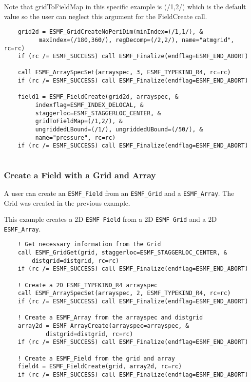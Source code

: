      Note that gridToFieldMap in this specific example is (/1,2/) which
     is the default value
     so the user can neglect this argument for the FieldCreate call. 

 \begin{verbatim}
    grid2d = ESMF_GridCreateNoPeriDim(minIndex=(/1,1/), &
          maxIndex=(/180,360/), regDecomp=(/2,2/), name="atmgrid", rc=rc)
    if (rc /= ESMF_SUCCESS) call ESMF_Finalize(endflag=ESMF_END_ABORT)

    call ESMF_ArraySpecSet(arrayspec, 3, ESMF_TYPEKIND_R4, rc=rc)
    if (rc /= ESMF_SUCCESS) call ESMF_Finalize(endflag=ESMF_END_ABORT)

    field1 = ESMF_FieldCreate(grid2d, arrayspec, &
         indexflag=ESMF_INDEX_DELOCAL, &
         staggerloc=ESMF_STAGGERLOC_CENTER, &
         gridToFieldMap=(/1,2/), &
         ungriddedLBound=(/1/), ungriddedUBound=(/50/), &
         name="pressure", rc=rc)
    if (rc /= ESMF_SUCCESS) call ESMF_Finalize(endflag=ESMF_END_ABORT)
 
\end{verbatim}
 

  \subsubsection{Create a Field with a Grid and Array}
  \label{sec:field:usage:create_grid_array}
  
    A user can create an {\tt ESMF\_Field} from an {\tt ESMF\_Grid} and a
    {\tt ESMF\_Array}. The Grid was created in the previous example.
  
    This example creates a 2D {\tt ESMF\_Field} from a 2D {\tt ESMF\_Grid}
    and a 2D {\tt ESMF\_Array}. 

 \begin{verbatim}
    ! Get necessary information from the Grid
    call ESMF_GridGet(grid, staggerloc=ESMF_STAGGERLOC_CENTER, &
        distgrid=distgrid, rc=rc)
    if (rc /= ESMF_SUCCESS) call ESMF_Finalize(endflag=ESMF_END_ABORT)

    ! Create a 2D ESMF_TYPEKIND_R4 arrayspec
    call ESMF_ArraySpecSet(arrayspec, 2, ESMF_TYPEKIND_R4, rc=rc)
    if (rc /= ESMF_SUCCESS) call ESMF_Finalize(endflag=ESMF_END_ABORT)

    ! Create a ESMF_Array from the arrayspec and distgrid
    array2d = ESMF_ArrayCreate(arrayspec=arrayspec, &
            distgrid=distgrid, rc=rc)
    if (rc /= ESMF_SUCCESS) call ESMF_Finalize(endflag=ESMF_END_ABORT)

    ! Create a ESMF_Field from the grid and array
    field4 = ESMF_FieldCreate(grid, array2d, rc=rc)
    if (rc /= ESMF_SUCCESS) call ESMF_Finalize(endflag=ESMF_END_ABORT)
 
\end{verbatim}
 
